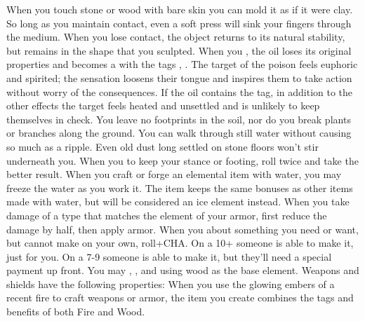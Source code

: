 \documentclass[darkmode]{dw_playbook}
\begin{document}
    {
            {When you touch stone or wood with bare skin you can mold it as if it were clay.  So long as you maintain contact, even a soft press will sink your fingers through the medium.  When you lose contact, the object returns to its natural stability, but remains in the shape that you sculpted.}
        \gap
            {When you , the oil loses its original properties and becomes a  with the tags , .
            \gap
            The target of the poison feels euphoric and spirited; the sensation loosens their tongue and inspires them to take action without worry of the consequences.
            \gap
            If the oil contains the  tag, in addition to the other effects the target feels heated and unsettled and is unlikely to keep themselves in check.}
        \gap
            {You leave no footprints in the soil, nor do you break plants or branches along the ground.  You can walk through still water without causing so much as a ripple.  Even old dust long settled on stone floors won’t stir underneath you.  When you  to keep your stance or footing, roll twice and take the better result.}
            {When you craft or forge an elemental item with water, you may freeze the water as you work it.  The item keeps the same bonuses as other items made with water, but will be considered an ice element instead.}
        \gap
            {When you take damage of a type that matches the element of your armor, first reduce the damage by half, then apply armor.}
        \gap
            {When you  about something you need or want, but cannot make on your own, roll+CHA.  On a 10+ someone is able to make it, just for you.  On a 7-9 someone is able to make it, but they’ll need a special payment up front.}
        \gap
            {You may , , and  using wood as the base element.  Weapons and shields have the following properties:
            \gapSm
            \gapSm
            }
        \gap
            {When you use the glowing embers of a recent fire to craft weapons or armor, the item you create combines the tags and benefits of both Fire and Wood.}
    }
\end{document}
